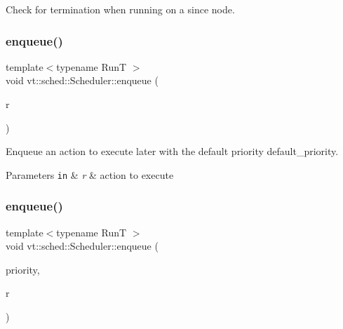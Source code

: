 Check for termination when running on a since node. 

\mbox{\label{structvt_1_1sched_1_1_scheduler_a768062132bfdc473b84722a3d51c26f3}} 
\subsubsection{\texorpdfstring{enqueue()}{enqueue()}\hspace{0.1cm}{\footnotesize\ttfamily [1/4]}}
{\footnotesize\ttfamily template$<$typename RunT $>$ \\
void vt\+::sched\+::\+Scheduler\+::enqueue (\begin{DoxyParamCaption}\item[{RunT}]{r }\end{DoxyParamCaption})}



Enqueue an action to execute later with the default priority {\ttfamily default\+\_\+priority}. 


\begin{DoxyParams}[1]{Parameters}
\mbox{\tt in}  & {\em r} & action to execute \\
\hline
\end{DoxyParams}
\mbox{\label{structvt_1_1sched_1_1_scheduler_a0bdc94a90457db0a1cf1e64bd463e927}} 
\subsubsection{\texorpdfstring{enqueue()}{enqueue()}\hspace{0.1cm}{\footnotesize\ttfamily [2/4]}}
{\footnotesize\ttfamily template$<$typename RunT $>$ \\
void vt\+::sched\+::\+Scheduler\+::enqueue (\begin{DoxyParamCaption}\item[{\hyperlink{namespacevt_a86bff9f556eb761b27fc8600d006ac04}{Priority\+Type}}]{priority,  }\item[{RunT}]{r }\end{DoxyParamCaption})}



